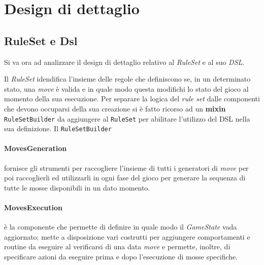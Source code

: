 \section{Design di dettaglio}



\subsection{RuleSet e Dsl}

Si va ora ad analizzare il design di dettaglio relativo al \textit{RuleSet} e al suo \textit{DSL}.

Il \textit{RuleSet} idendifica l'insieme delle regole che definiscono se, in un determinato stato, una \textit{move} è valida e in quale modo questa modifichi lo stato del gioco al momento della sua esecuzione.
%
Per separare la logica del \textit{rule set} dalle componenti che devono occuparsi della sua creazione si è fatto ricorso ad un \textbf{mixin} \texttt{RuleSetBuilder} da aggiungere al \texttt{RuleSet} per abilitare l'utilizzo del DSL nella sua definizione.
%
Il \texttt{RuleSetBuilder} 

\paragraph{MovesGeneration} fornisce gli strumenti per raccogliere l'insieme di tutti i generatori di \textit{move} per poi raccoglierli ed utilizzarli in ogni fase del gioco per generare la sequenza di tutte le mosse disponibili in un dato momento.

\paragraph{MovesExecution} è la componente che permette di definire in quale modo il \textit{GameState} vada aggiornato; mette a disposizione vari costrutti per aggiungere comportamenti e routine da eseguire al verificarsi di una data \textit{move} e permette, inoltre, di specificare azioni da eseguire prima e dopo l'esecuzione di mosse specifiche.


